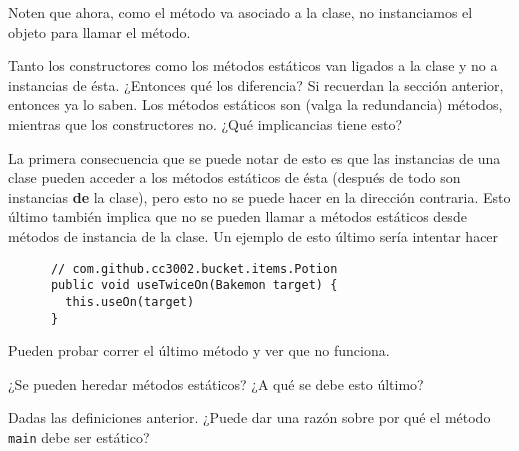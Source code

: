     Noten que ahora, como el método va asociado a la clase, no instanciamos el objeto para llamar el
    método.
    
    Tanto los constructores como los métodos estáticos van ligados a la clase y no a instancias de
    ésta.
    ¿Entonces qué los diferencia?
    Si recuerdan la sección anterior, entonces ya lo saben.
    Los métodos estáticos son (valga la redundancia) métodos, mientras que los constructores no.
    ¿Qué implicancias tiene esto?

    La primera consecuencia que se puede notar de esto es que las instancias de una clase pueden
    acceder a los métodos estáticos de ésta (después de todo son instancias \textbf{de} la clase),
    pero esto no se puede hacer en la dirección contraria.
    Esto último también implica que no se pueden llamar a métodos estáticos desde métodos de 
    instancia de la clase.
    Un ejemplo de esto último sería intentar hacer
    
    \begin{verbatim}
      // com.github.cc3002.bucket.items.Potion
      public void useTwiceOn(Bakemon target) {
        this.useOn(target)
      }
    \end{verbatim}

    Pueden probar correr el último método y ver que no funciona.

    \begin{exercise}
      ¿Se pueden heredar métodos estáticos?
      ¿A qué se debe esto último?
    \end{exercise}
    
    \begin{exercise}
      Dadas las definiciones anterior. 
      ¿Puede dar una razón sobre por qué el método \texttt{main} debe ser estático?
    \end{exercise}
